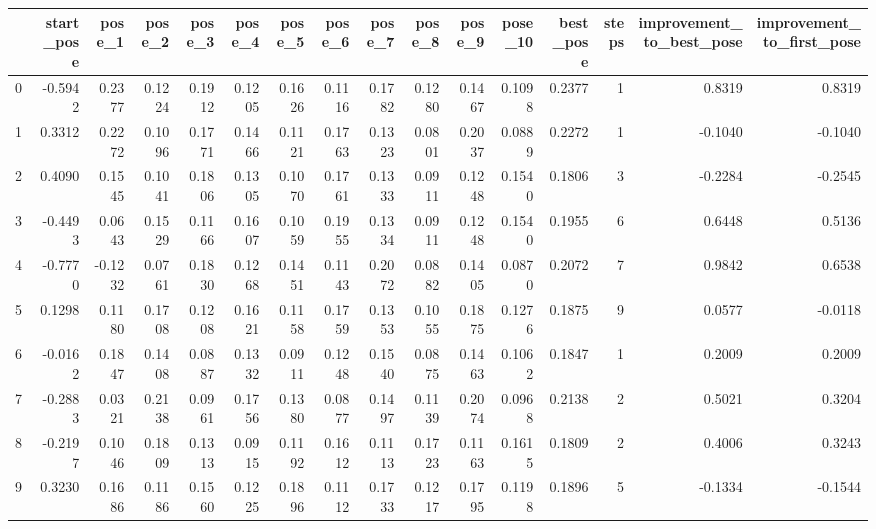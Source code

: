 \begin{tabular}{lrrrrrrrrrrrrrrr}
\toprule
{} &  start\_pose &  pose\_1 &  pose\_2 &  pose\_3 &  pose\_4 &  pose\_5 &  pose\_6 &  pose\_7 &  pose\_8 &  pose\_9 &  pose\_10 &  best\_pose &  steps &  improvement\_to\_best\_pose &  improvement\_to\_first\_pose \\
\midrule
0   &     -0.5942 &  0.2377 &  0.1224 &  0.1912 &  0.1205 &  0.1626 &  0.1116 &  0.1782 &  0.1280 &  0.1467 &   0.1098 &     0.2377 &      1 &                    0.8319 &                     0.8319 \\
1   &      0.3312 &  0.2272 &  0.1096 &  0.1771 &  0.1466 &  0.1121 &  0.1763 &  0.1323 &  0.0801 &  0.2037 &   0.0889 &     0.2272 &      1 &                   -0.1040 &                    -0.1040 \\
2   &      0.4090 &  0.1545 &  0.1041 &  0.1806 &  0.1305 &  0.1070 &  0.1761 &  0.1333 &  0.0911 &  0.1248 &   0.1540 &     0.1806 &      3 &                   -0.2284 &                    -0.2545 \\
3   &     -0.4493 &  0.0643 &  0.1529 &  0.1166 &  0.1607 &  0.1059 &  0.1955 &  0.1334 &  0.0911 &  0.1248 &   0.1540 &     0.1955 &      6 &                    0.6448 &                     0.5136 \\
4   &     -0.7770 & -0.1232 &  0.0761 &  0.1830 &  0.1268 &  0.1451 &  0.1143 &  0.2072 &  0.0882 &  0.1405 &   0.0870 &     0.2072 &      7 &                    0.9842 &                     0.6538 \\
5   &      0.1298 &  0.1180 &  0.1708 &  0.1208 &  0.1621 &  0.1158 &  0.1759 &  0.1353 &  0.1055 &  0.1875 &   0.1276 &     0.1875 &      9 &                    0.0577 &                    -0.0118 \\
6   &     -0.0162 &  0.1847 &  0.1408 &  0.0887 &  0.1332 &  0.0911 &  0.1248 &  0.1540 &  0.0875 &  0.1463 &   0.1062 &     0.1847 &      1 &                    0.2009 &                     0.2009 \\
7   &     -0.2883 &  0.0321 &  0.2138 &  0.0961 &  0.1756 &  0.1380 &  0.0877 &  0.1497 &  0.1139 &  0.2074 &   0.0968 &     0.2138 &      2 &                    0.5021 &                     0.3204 \\
8   &     -0.2197 &  0.1046 &  0.1809 &  0.1313 &  0.0915 &  0.1192 &  0.1612 &  0.1113 &  0.1723 &  0.1163 &   0.1615 &     0.1809 &      2 &                    0.4006 &                     0.3243 \\
9   &      0.3230 &  0.1686 &  0.1186 &  0.1560 &  0.1225 &  0.1896 &  0.1112 &  0.1733 &  0.1217 &  0.1795 &   0.1198 &     0.1896 &      5 &                   -0.1334 &                    -0.1544 \\

\end{tabular}
